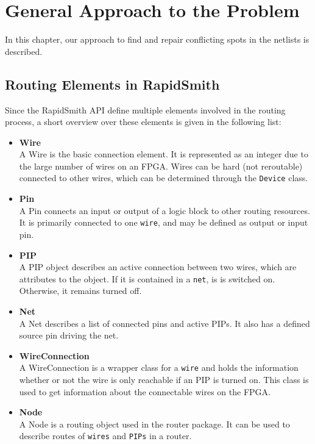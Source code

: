 \chapter{General Approach to the Problem}
\label{cha:approachestotheproblem}

In this chapter, our approach to find and repair conflicting spots in the netlists is described.

\section{Routing Elements in RapidSmith}
\label{sec:routingelementsinrapidsmith}

Since the RapidSmith API define multiple elements involved in the routing process, a short overview over these elements is given in the following list:
\begin{itemize}
\item \textbf{Wire}\hfill \\
A Wire is the basic connection element. It is represented as an integer due to the large number of wires on an FPGA. Wires can be hard (not reroutable) connected to other wires, which can be determined through the \texttt{Device} class. %
\item \textbf{Pin}\hfill \\
A Pin connects an input or output of a logic block to other routing resources. It is primarily connected to one \texttt{wire}, and may be defined as output or input pin.
\item \textbf{PIP}\hfill \\
A PIP object describes an active connection between two wires, which are attributes to the object. If it is contained in a \texttt{net}, is is switched on. Otherwise, it remains turned off.
\item \textbf{Net}\hfill \\
A Net describes a list of connected pins and active PIPs. It also has a defined source pin driving the net.
\item \textbf{WireConnection}\hfill \\
A WireConnection is a wrapper class for a \texttt{wire} and holds the information whether or not the wire is only reachable if an PIP is turned on. This class is used to get information about the connectable wires on the FPGA.
\item \textbf{Node}\hfill \\
A Node is a routing object used in the router package. It can be used to describe routes of \texttt{wires} and \texttt{PIPs} in a router.

\end{itemize}
